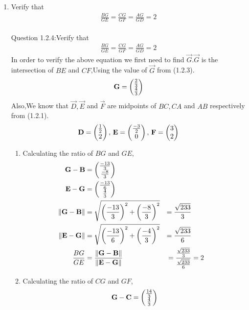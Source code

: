 \documentclass[11pt]{book}
\begin{document}
\begin{enumerate}[label=\thesection.\arabic*.,ref=\thesection.\theenumi]
\item Verify that 
		\begin{align}
			\frac{BG}{GE} = 
			\frac{CG}{GF} =
			\frac{AG}{GD} =2 
		\end{align}\\
Question 1.2.4:Verify that 
\begin{align}
		\frac{BG}{GE} = 
		\frac{CG}{GF} =
		\frac{AG}{GD} = 2 
\end{align}
\solution In order to verify the above equation we first need to find $\vec{G}$.$\vec{G}$ is the intersection of $BE$ and $CF$,Using the value of $\vec{G}$ from (1.2.3).
\begin{align}
		\mathbf{G} = \begin{pmatrix}\frac{2}{3} \\ \frac{4}{3}\end{pmatrix}
\end{align}
Also,We know that $\vec{D}, \vec{E}$ and $\vec{F}$ are midpoints of $BC, CA$ and $AB$ respectively from (1.2.1).
\begin{align}
		\mathbf{D} = \begin{pmatrix}\frac{1}{2} \\ 2\end{pmatrix},\,
		\mathbf{E} = \begin{pmatrix}\frac{-3}{2} \\ 0\end{pmatrix},\,
		\mathbf{F} = \begin{pmatrix}3 \\ 2\end{pmatrix}
\end{align}
\begin{enumerate}
\item Calculating the ratio of $BG$ and $GE$,
\begin{align}
		\label{eq:tri-pts/4} \vec{G}-\vec{B} &= \myvec{\frac{-13}{3} \\ \frac{-8}{3}} \\
		\label{eq:tri-pts/5} \vec{E}-\vec{G} &= \myvec{\frac{-13}{6} \\ \frac{4}{3}} \\
		\label{eq:tri-pts/6} \norm{\vec{G}-\vec{B}} &= \sqrt{\brak{\frac{-13}{3}}^2 + \brak{\frac{-8}{3}}^{2}} &= \frac{\sqrt{233}}{3} \\
		\label{eq:tri-pts/7} \norm{\vec{E}-\vec{G}} &= \sqrt{\brak{\frac{-13}{6}}^2 + \brak{\frac{-4}{3}}^2} &= \frac{\sqrt{233}}{6} \\
		\label{eq:tri-pts/8}\frac{BG}{GE} &= \frac{\norm{\vec{G}-\vec{B}}}{\norm{\vec{E}-\vec{G}}} &= \frac{\frac{\sqrt{233}}{3}}{\frac{\sqrt{233}}{6}} &= 2  
\end{align}		
\item Calculating the ratio of $CG$ and $GF$,
\begin{align}
		\label{eq:tri-pts/9} \vec{G}-\vec{C} &= \myvec{\frac{14}{3} \\ \frac{4}{3}} \\

\end{align}
\end{enumerate}
\end{enumerate}
\end{document}
